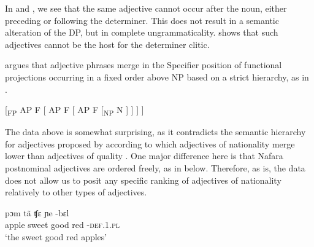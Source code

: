 \documentclass[output=paper]{langscibook}
\begin{document}
\ea\label{ex:baron:10}

 
 
\z
\z


In  and , we see that the same adjective cannot occur after the noun, either preceding or following the determiner. This does not result in a semantic alteration of the DP, but in complete ungrammaticality.  shows that such adjectives cannot be the host for the determiner clitic. 

\citet{Cinque1994} argues that adjective phrases merge in the Specifier position of functional projections occurring in a fixed order above NP based on a strict hierarchy, as in .


\ea\label{ex:baron:11}
[\textsubscript{FP}  AP  F  [  AP  F  [  AP  F  [\textsubscript{NP}  N  ] ] ] ]
\z

The data above is somewhat surprising, as it contradicts the semantic hierarchy for adjectives proposed by \citet{Cinque1994} according to which adjectives of nationality merge lower than adjectives of quality \citep[96]{Cinque1994}. One major difference here is that Nafara postnominal adjectives are ordered freely, as in  below. Therefore, as is, the data does not allow us to posit any specific ranking of adjectives of nationality relatively to other types of adjectives.

\pagebreak
\ea\label{ex:baron:12}
\ea
\gll pɔm     tã   ʧɛ     ɲe    -bɛl    \\
apple    sweet   good    red    -\textsc{def.1.pl}\\
\glt ‘the sweet good red apples’
\end{document}
